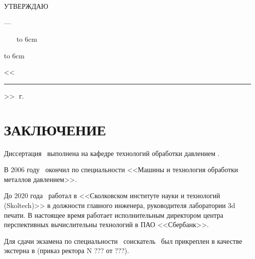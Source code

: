 


\hfill\parbox{6cm}{
\centerline{УТВЕРЖДАЮ}
\centerline{\thesisOrganisationHead ---}
\thesisOrganizationShort\
\thesisOrganisationHeadRegalia\ 
\thesisOrganisationHeadFioShort\
\linebreak
{\hbox to 6cm{\hrulefill}}
{\hbox to 6cm{<<\rule{7mm}{0.4pt}>>\hrulefill~\number\year\,г.}}}
\vspace{1cm}



\section{ЗАКЛЮЧЕНИЕ \\
	\thesisOrganization}


Диссертация \thesisAuthorLastNameFromFull\ \thesisTitle выполнена на кафедре технологий обработки давлением \thesisOrganizationShort.

В 2006 году \thesisAuthorLastName~\thesisAuthorOtherNames окончил \thesisOrganizationShort по специальности <<Машины и технология обработки металлов давлением>>.

До 2020 года \thesisAuthorLastName~\thesisAuthorOtherNames работал в <<Сколковском институте науки и технологий (Skoltech)>> в должности главного инженера, руководителя лаборатории 3d печати. В настоящее время работает исполнительным директором центра перспективных вычислительны технологий в ПАО <<Сбербанк>>.

Для сдачи экзамена по специальности \thesisSpecialtyNumber~\thesisSpecialtyTitle соискатель \thesisAuthorLastName~\thesisAuthorOtherNames был прикреплен в качестве экстерна в \thesisOrganizationShort (приказ ректора 
N ??? от ???). 

